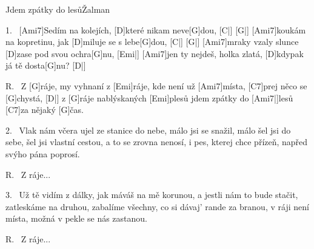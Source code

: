\begin{song}{Jdem zpátky do lesů}{Žalman}

\begin{xverse}{1.~}
[\large Ami7]Sedím na kolejích, [\large D]které nikam neve[\large G]dou, [\large C|]{} [\large G|]{}
[\large Ami7]koukám na kopretinu, jak [\large D]miluje se s lebe[\large G]dou, [\large C|]{} [\large G|]{}
[\large Ami7]mraky vzaly slunce [\large D]zase pod svou ochra[\large G]nu, [\large Emi|]{}
[\large Ami7]jen ty nejdeš, holka zlatá, [\large D]kdypak já tě dosta[\large G]nu? [\large D|]{}
\end{xverse}

\begin{xverse}{R.~}
Z [\large G]ráje, my vyhnaní z [\large Emi]ráje,
kde není už [\large Ami7]místa, [\large C7]prej něco se [\large G]chystá, [\large D|]{}
z [\large G]ráje nablýskaných [\large Emi]plesů
jdem zpátky do [\large Ami7|]{lesů} [\large C7]{}za nějaký [\large G]{}čas.
\end{xverse}

\begin{xverse}{2.~}
Vlak nám včera ujel ze stanice do nebe,
málo jsi se snažil, málo šel jsi do sebe,
šel jsi vlastní cestou, a to se zrovna nenosí,
i pes, kterej chce přízeň, napřed svýho pána poprosí.
\end{xverse}

\begin{xverse}{R.~}
Z ráje...
\end{xverse}

\begin{xverse}{3.~}
Už tě vidím z dálky, jak máváš na mě korunou,
a jestli nám to bude stačit, zatleskáme na druhou,
zabalíme všechny, co si dávaj' rande za branou,
v ráji není místa, možná v pekle se nás zastanou.
\end{xverse}

\begin{xverse}{R.~}
Z ráje...
\end{xverse}

\end{song}

